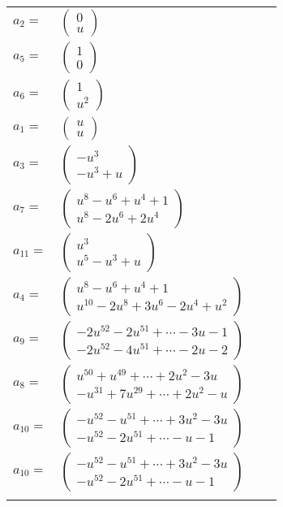 \documentclass[1p]{elsarticle_modified}
\theoremstyle{definition}
\begin{document}
\begin{tabular}{m{7pt} m{180pt} m{7pt} m{180pt} }
\flushright $a_{2}=$&$\begin{pmatrix}0\\u\end{pmatrix}$ \\
\flushright $a_{5}=$&$\begin{pmatrix}1\\0\end{pmatrix}$ \\
\flushright $a_{6}=$&$\begin{pmatrix}1\\u^2\end{pmatrix}$ \\
\flushright $a_{1}=$&$\begin{pmatrix}u\\u\end{pmatrix}$ \\
\flushright $a_{3}=$&$\begin{pmatrix}- u^3\\- u^3+u\end{pmatrix}$ \\
\flushright $a_{7}=$&$\begin{pmatrix}u^8- u^6+u^4+1\\u^8-2 u^6+2 u^4\end{pmatrix}$ \\
\flushright $a_{11}=$&$\begin{pmatrix}u^3\\u^5- u^3+u\end{pmatrix}$ \\
\flushright $a_{4}=$&$\begin{pmatrix}u^8- u^6+u^4+1\\u^{10}-2 u^8+3 u^6-2 u^4+u^2\end{pmatrix}$ \\
\flushright $a_{9}=$&$\begin{pmatrix}-2 u^{52}-2 u^{51}+\cdots-3 u-1\\-2 u^{52}-4 u^{51}+\cdots-2 u-2\end{pmatrix}$ \\
\flushright $a_{8}=$&$\begin{pmatrix}u^{50}+u^{49}+\cdots+2 u^2-3 u\\- u^{31}+7 u^{29}+\cdots+2 u^2- u\end{pmatrix}$ \\
\flushright $a_{10}=$&$\begin{pmatrix}- u^{52}- u^{51}+\cdots+3 u^2-3 u\\- u^{52}-2 u^{51}+\cdots- u-1\end{pmatrix}$\\ \flushright $a_{10}=$&$\begin{pmatrix}- u^{52}- u^{51}+\cdots+3 u^2-3 u\\- u^{52}-2 u^{51}+\cdots- u-1\end{pmatrix}$\\&\end{tabular}
\end{document}
